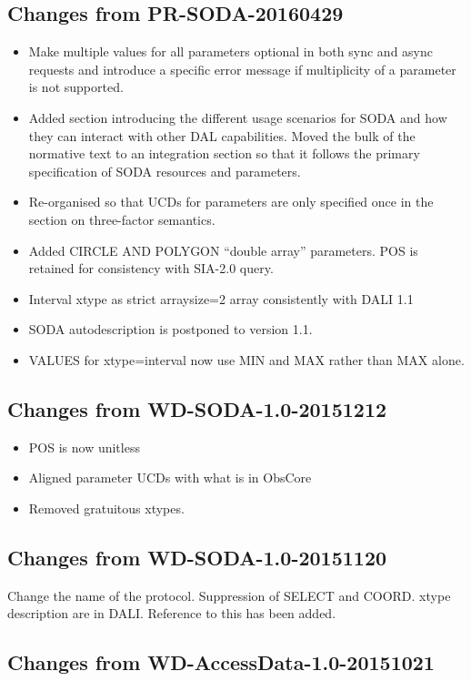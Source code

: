 \documentclass[11pt,a4paper]{ivoa}
\begin{document}
\subsection{Changes from PR-SODA-20160429}
\begin{itemize}
\item Make multiple values for all parameters optional in both {sync} and 
{async} requests and introduce a specific error message if multiplicity of 
a parameter is not supported.
\item Added section introducing the different usage scenarios for SODA
and how they can interact with other DAL capabilities. Moved the bulk of
the normative text to an integration section so that it follows the
primary specification of SODA resources and parameters.
\item Re-organised so that UCDs for parameters are only specified once
in the section on three-factor semantics.
\item Added CIRCLE AND POLYGON ``double array'' parameters. POS is
retained for consistency with SIA-2.0 query. 
\item Interval xtype as strict arraysize=2 array consistently with DALI 1.1 
\item SODA autodescription is postponed to version 1.1.
\item VALUES for xtype=interval now use MIN and MAX rather than MAX
alone.
\end{itemize}

\subsection{Changes from WD-SODA-1.0-20151212}
\begin{itemize}
\item POS is now unitless
\item Aligned parameter UCDs with what is in ObsCore
\item Removed gratuitous xtypes.
\end{itemize}

\subsection{Changes from WD-SODA-1.0-20151120}

Change the name of the protocol. Suppression of SELECT and COORD. xtype description are in DALI. Reference to this has been added.

\subsection{Changes from WD-AccessData-1.0-20151021}
\end{document}
